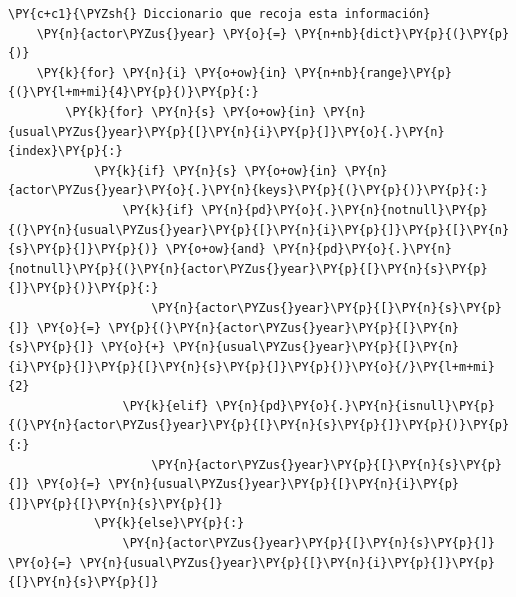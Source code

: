 \begin{tcolorbox}[breakable, size=fbox, boxrule=1pt, pad at break*=1mm,colback=cellbackground, colframe=cellborder]
\begin{Verbatim}[commandchars=\\\{\}]
    \PY{c+c1}{\PYZsh{} Diccionario que recoja esta información}
    \PY{n}{actor\PYZus{}year} \PY{o}{=} \PY{n+nb}{dict}\PY{p}{(}\PY{p}{)}
    \PY{k}{for} \PY{n}{i} \PY{o+ow}{in} \PY{n+nb}{range}\PY{p}{(}\PY{l+m+mi}{4}\PY{p}{)}\PY{p}{:}
        \PY{k}{for} \PY{n}{s} \PY{o+ow}{in} \PY{n}{usual\PYZus{}year}\PY{p}{[}\PY{n}{i}\PY{p}{]}\PY{o}{.}\PY{n}{index}\PY{p}{:}
            \PY{k}{if} \PY{n}{s} \PY{o+ow}{in} \PY{n}{actor\PYZus{}year}\PY{o}{.}\PY{n}{keys}\PY{p}{(}\PY{p}{)}\PY{p}{:}
                \PY{k}{if} \PY{n}{pd}\PY{o}{.}\PY{n}{notnull}\PY{p}{(}\PY{n}{usual\PYZus{}year}\PY{p}{[}\PY{n}{i}\PY{p}{]}\PY{p}{[}\PY{n}{s}\PY{p}{]}\PY{p}{)} \PY{o+ow}{and} \PY{n}{pd}\PY{o}{.}\PY{n}{notnull}\PY{p}{(}\PY{n}{actor\PYZus{}year}\PY{p}{[}\PY{n}{s}\PY{p}{]}\PY{p}{)}\PY{p}{:}
                    \PY{n}{actor\PYZus{}year}\PY{p}{[}\PY{n}{s}\PY{p}{]} \PY{o}{=} \PY{p}{(}\PY{n}{actor\PYZus{}year}\PY{p}{[}\PY{n}{s}\PY{p}{]} \PY{o}{+} \PY{n}{usual\PYZus{}year}\PY{p}{[}\PY{n}{i}\PY{p}{]}\PY{p}{[}\PY{n}{s}\PY{p}{]}\PY{p}{)}\PY{o}{/}\PY{l+m+mi}{2}
                \PY{k}{elif} \PY{n}{pd}\PY{o}{.}\PY{n}{isnull}\PY{p}{(}\PY{n}{actor\PYZus{}year}\PY{p}{[}\PY{n}{s}\PY{p}{]}\PY{p}{)}\PY{p}{:}
                    \PY{n}{actor\PYZus{}year}\PY{p}{[}\PY{n}{s}\PY{p}{]} \PY{o}{=} \PY{n}{usual\PYZus{}year}\PY{p}{[}\PY{n}{i}\PY{p}{]}\PY{p}{[}\PY{n}{s}\PY{p}{]}
            \PY{k}{else}\PY{p}{:}
                \PY{n}{actor\PYZus{}year}\PY{p}{[}\PY{n}{s}\PY{p}{]} \PY{o}{=} \PY{n}{usual\PYZus{}year}\PY{p}{[}\PY{n}{i}\PY{p}{]}\PY{p}{[}\PY{n}{s}\PY{p}{]}
        

\end{Verbatim}
\end{tcolorbox}
